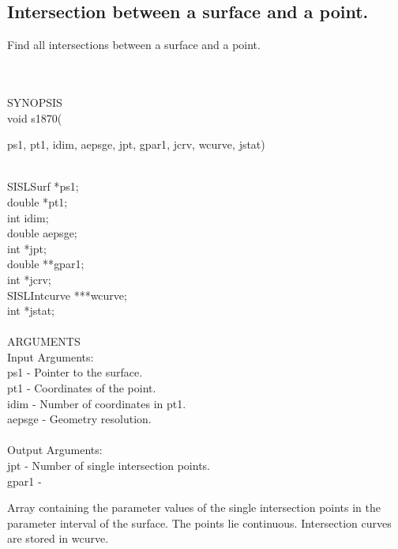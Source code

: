 \subsection{Intersection between a surface and a point.}
\begin{minipg1}
  Find all intersections between a surface and a point.
\end{minipg1} \\ \\
SYNOPSIS\\
        \>void s1870(\begin{minipg3}
        {\fov ps1}, {\fov pt1}, {\fov idim}, {\fov aepsge}, {\fov jpt}, {\fov gpar1}, {\fov jcrv}, {\fov wcurve}, {\fov jstat})
      \end{minipg3}\\[0.3ex]
      \>\>    SISLSurf    \>  *{\fov ps1};\\
      \>\>    double      \>  *{\fov pt1};\\
      \>\>    int         \>  {\fov idim};\\
      \>\>    double      \>  {\fov aepsge};\\
      \>\>    int         \>  *{\fov jpt};\\
      \>\>    double      \>  **{\fov gpar1};\\
      \>\>    int         \>  *{\fov jcrv};\\
      \>\>    SISLIntcurve\>  ***{\fov wcurve};\\
      \>\>    int         \>  *{\fov jstat};\\
\\
ARGUMENTS\\
        \>Input Arguments:\\
        \>\>    {\fov ps1}    \> - \> Pointer to the surface.\\
        \>\>    {\fov pt1}    \> - \> Coordinates of the point.\\
        \>\>    {\fov idim}   \> - \> Number of coordinates in pt1.\\
        \>\>    {\fov aepsge} \> - \> Geometry resolution.\\
\\
        \>Output Arguments:\\
        \>\>    {\fov jpt}    \> - \> Number of single intersection points.\\
        \>\>    {\fov gpar1}  \> - \> \begin{minipg2}
                                        Array containing the parameter values of the
                                        single intersection points in the parameter
                                        interval of the surface. The points lie
                                        continuous. Intersection curves
                                        are stored in wcurve.
                                      \end{minipg2}\\[0.8ex]

